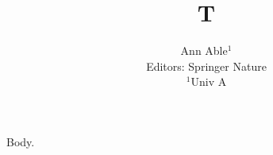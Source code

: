 \documentclass{article}
\begin{document}
\title{T}
\author{Ann Able$^1$\\
Editors: Springer Nature\\
$^1$Univ A}
\maketitle
Body.
\end{document}
